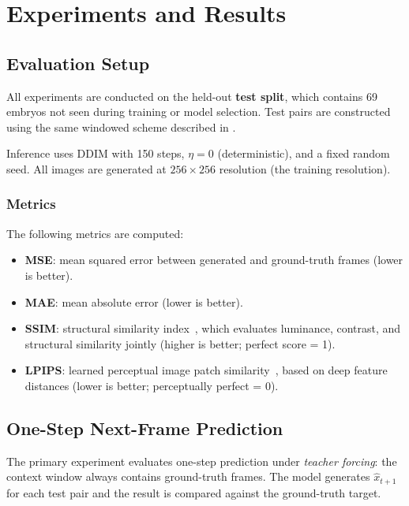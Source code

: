 \documentclass[12pt, a4paper, twoside]{report}
\begin{document}
\chapter{Experiments and Results}
\label{chap:experiments}

\section{Evaluation Setup}
\label{sec:eval_setup}

All experiments are conducted on the held-out \textbf{test split}, which
contains 69 embryos not seen during training or model selection.
Test pairs are constructed using the same windowed scheme described in
.

Inference uses DDIM with 150 steps, $\eta = 0$ (deterministic), and a fixed
random seed.
All images are generated at $256 \times 256$ resolution (the training
resolution).

\subsection{Metrics}
\label{ssec:metrics}

The following metrics are computed:
\begin{itemize}
  \item \textbf{MSE}: mean squared error between generated and ground-truth
        frames (lower is better).
  \item \textbf{MAE}: mean absolute error (lower is better).
  \item \textbf{SSIM}: structural similarity index~\cite{wang2004ssim},
        which evaluates luminance, contrast, and structural similarity
        jointly (higher is better; perfect score = 1).
  \item \textbf{LPIPS}: learned perceptual image patch similarity~\cite{zhang2018lpips},
        based on deep feature distances (lower is better; perceptually
        perfect = 0).
\end{itemize}

\section{One-Step Next-Frame Prediction}
\label{sec:onestep}

The primary experiment evaluates one-step prediction under \emph{teacher
forcing}: the context window always contains ground-truth frames.
The model generates $\hat{x}_{t+1}$ for each test pair and the result is
compared against the ground-truth target.
\end{document}
